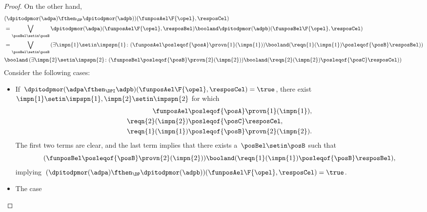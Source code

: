 \begin{proof}
    On the other hand,
    \begin{equation}
        \label{eq:dpitodp_b}
        \begin{aligned}
             & (\dpitodpmor(\adpa) \fthen_\DP \dpitodpmor(\adpb))(\funposAel\F{\opel},\resposCel) \\
             & =\bigvee_{\posBel \setin \posB}\dpitodpmor(\adpa)(\funposAel\F{\opel},\resposBel)\booland \dpitodpmor(\adpb)(\funposBel\F{\opel},\resposCel) \\
             & =\bigvee_{\posBel \setin \posB} \left({\exists \impn{1} \setin \impspn{1}\colon (\funposAel \posleqof{\posA}\provn{1}(\impn{1}))\booland (\reqn{1}(\impn{1})\posleqof{\posB} \resposBel)}\right) \\
             & \booland \left({\exists \impn{2} \setin \impspn{2}\colon (\funposBel \posleqof{\posB}\provn{2}(\impn{2}))\booland (\reqn{2}(\impn{2})\posleqof{\posC} \resposCel)}\right)
        \end{aligned}
    \end{equation}
    Consider the following cases:
    \begin{itemize}
        \item If~$\dpitodpmor(\adpa \fthen_\DPI \adpb)(\funposAel\F{\opel},\resposCel)=\true$, there exist~$\impn{1}\setin \impspn{1},\impn{2}\setin \impspn{2}$ for which
              \begin{equation}
                  \begin{aligned}
                      \funposAel         & \posleqof{\posA}\provn{1}(\impn{1}), \\
                      \reqn{2}(\impn{2}) & \posleqof{\posC} \resposCel, \\
                      \reqn{1}(\impn{1}) & \posleqof{\posB}\provn{2}(\impn{2}).
                  \end{aligned}
              \end{equation}
              The first two terms are clear, and the last term implies that there exists a~$\posBel\setin \posB$ such that
              \begin{equation}
                  (\funposBel\posleqof{\posB}\provn{2}(\impn{2}))
                  \booland (\reqn{1}(\impn{1})\posleqof{\posB}\resposBel),
              \end{equation}
              implying~$(\dpitodpmor(\adpa) \fthen_\DP \dpitodpmor(\adpb))(\funposAel\F{\opel},\resposCel)=\true$.
        \item The case
              \begin{equation}

\end{equation}
\end{itemize}
\end{proof}
